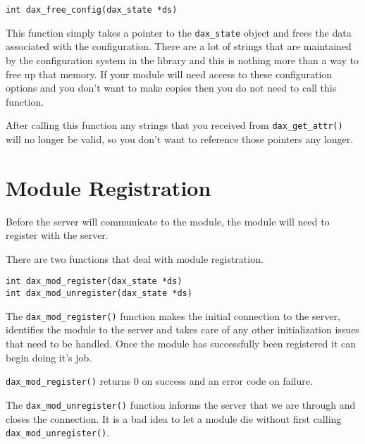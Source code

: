 \begin{verbatim}
int dax_free_config(dax_state *ds)
\end{verbatim}

This function simply takes a pointer to the \verb|dax_state| object and frees the data associated with the configuration.  There are a lot of strings that are maintained by the configuration system in the library and this is nothing more than a way to free up that memory.  If your module will need access to these configuration options and you don't want to make copies then you do not need to call this function.

After calling this function any strings that you received from \verb|dax_get_attr()| will no longer be valid, so you don't want to reference those pointers any longer.

\section{Module Registration}
Before the server will communicate to the module, the module will need to register with the server.

There are two functions that deal with module registration.
\begin{verbatim}
int dax_mod_register(dax_state *ds)
int dax_mod_unregister(dax_state *ds)
\end{verbatim}

The \verb|dax_mod_register()| function makes the initial connection to the server, identifies the module to the server and takes care of any other initialization issues that need to be handled.  Once the module has successfully been registered it can begin doing it's job.

\verb|dax_mod_register()| returns 0 on success and an error code on failure.

The \verb|dax_mod_unregister()| function informs the server that we are through and closes the connection.  It is a bad idea to let a module die without first calling \verb|dax_mod_unregister()|.
